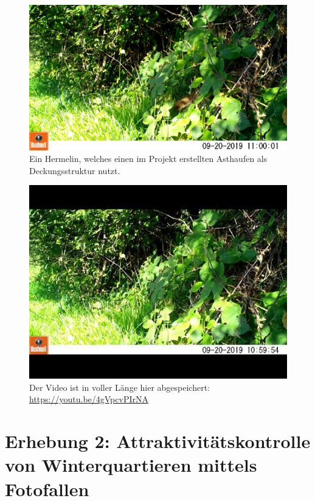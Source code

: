 \documentclass[
  oneside]{scrbook}
\begin{document}
\begin{figure}
\includegraphics[width=1\linewidth]{images/str196/capture} \caption{Ein Hermelin, welches einen im Projekt erstellten Asthaufen als Deckungsstruktur nutzt.}\label{fig:hermelinstr196}
\end{figure}

\begin{figure}[hbt!] \centering \includegraphics{images/youtube/4gVpcvPIrNA.jpg} \caption{Der Video ist in voller Länge hier abgespeichert: \url{https://youtu.be/4gVpcvPIrNA}} \end{figure}

\hypertarget{erhebung-2-attraktivituxe4tskontrolle-von-winterquartieren-mittels-fotofallen-1}{%
\section{Erhebung 2: Attraktivitätskontrolle von Winterquartieren mittels Fotofallen}\label{erhebung-2-attraktivituxe4tskontrolle-von-winterquartieren-mittels-fotofallen-1}}
\end{document}

